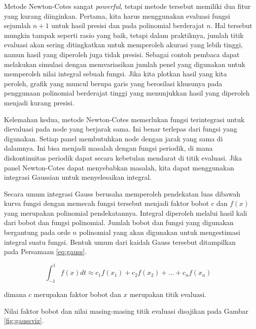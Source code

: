 \documentclass[
]{book}
\theoremstyle{definition}
\theoremstyle{definition}
\theoremstyle{definition}
\theoremstyle{definition}
\theoremstyle{remark}
\begin{document}
Metode Newton-Cotes sangat \emph{powerful}, tetapi metode tersebut memiliki dua fitur yang kurang diinginkan. Pertama, kita harus menggunakan evaluasi fungsi sejumlah \(n +1\) untuk hasil presisi dan pada polinomial berderajat \(n\). Hal tersebut mungkin tampak seperti rasio yang baik, tetapi dalam praktiknya, jumlah titik evaluasi akan sering ditingkatkan untuk memperoleh akurasi yang lebih tinggi, namun hasil yang diperoleh juga tidak presisi. Sebagai contoh pembaca dapat melakukan simulasi dengan memvariasikan jumlah penel yang digunakan untuk memperoleh nilai integral sebuah fungsi. Jika kita plotkan hasil yang kita peroleh, grafik yang muncul berupa garis yang berosilasi khusunya pada penggunaan polinomial berderajat tinggi yang menunjukkan hasil yang diperoleh menjadi kurang presisi.

Kelemahan kedua, metode Newton-Cotes memerlukan fungsi terintegrasi untuk dievaluasi pada node yang berjarak sama. Ini benar terlepas dari fungsi yang digunakan. Setiap panel membutuhkan node dengan jarak yang sama di dalamnya. Ini bisa menjadi masalah dengan fungsi periodik, di mana diskontinuitas periodik dapat secara kebetulan mendarat di titik evaluasi. Jika panel Newton-Cotes dapat menyebabkan masalah, kita dapat menggunakan integrasi Gaussian untuk menyelesaikan integral.

Secara umum integrasi Gauss berusaha memperoleh pendekatan luas dibawah kurva fungsi dengan memecah fungsi tersebut menjadi faktor bobot \(c\) dan \(f\left(x\right)\) yang merupakan polinomial pendekatannya. Integral diperoleh melalui hasil kali dari bobot dan fungsi polinomial. Jumlah bobot dan fungsi yang digunakan bergantung pada orde \(n\) polinomial yang akan digunakan untuk mengestimasi integral suatu fungsi. Bentuk umum dari kaidah Gauss tersebut ditampilkan pada Persamaan \eqref{eq:gauss}.

\begin{equation}
\int_{-1}^1f\left(x\right)dt\approx c_1f\left(x_1\right)+c_2f\left(x_2\right)+\dots+c_nf\left(x_n\right)
  \label{eq:gauss}
\end{equation}

dimana \(c\) merupakan faktor bobot dan \(x\) merupakan titik evaluasi.

Nilai faktor bobot dan nilai masing-masing titik evaluasi disajikan pada Gambar \ref{fig:gaussviz}.
\end{document}
